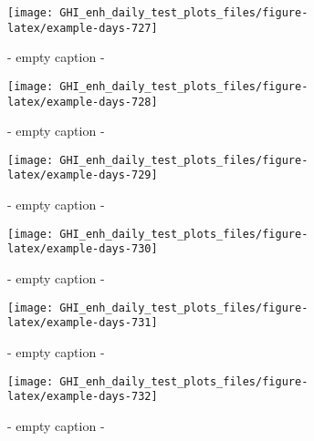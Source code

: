 \documentclass[
  10pt,
  a4paper,oneside]{article}
\begin{document}
\begin{figure}[H]

{\centering \texttt{[image: GHI\_enh\_daily\_test\_plots\_files/figure-latex/example-days-727]} 

}

\caption{ - empty caption - }\label{fig:example-days-727}
\end{figure}

\begin{figure}[H]

{\centering \texttt{[image: GHI\_enh\_daily\_test\_plots\_files/figure-latex/example-days-728]} 

}

\caption{ - empty caption - }\label{fig:example-days-728}
\end{figure}

\begin{figure}[H]

{\centering \texttt{[image: GHI\_enh\_daily\_test\_plots\_files/figure-latex/example-days-729]} 

}

\caption{ - empty caption - }\label{fig:example-days-729}
\end{figure}

\begin{figure}[H]

{\centering \texttt{[image: GHI\_enh\_daily\_test\_plots\_files/figure-latex/example-days-730]} 

}

\caption{ - empty caption - }\label{fig:example-days-730}
\end{figure}

\begin{figure}[H]

{\centering \texttt{[image: GHI\_enh\_daily\_test\_plots\_files/figure-latex/example-days-731]} 

}

\caption{ - empty caption - }\label{fig:example-days-731}
\end{figure}

\begin{figure}[H]

{\centering \texttt{[image: GHI\_enh\_daily\_test\_plots\_files/figure-latex/example-days-732]} 

}

\caption{ - empty caption - }\label{fig:example-days-732}
\end{figure}
\end{document}
